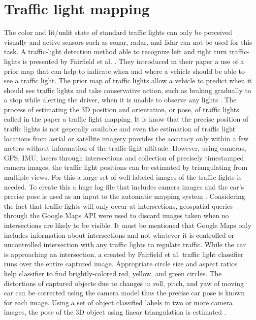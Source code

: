 \documentclass[letterpaper, 10 pt, conference]{ieeeconf} %
\begin{document}
\section{Traffic light mapping}
The color and lit/unlit state of standard traffic lights can only be perceived visually and active sensors such as sonar, radar, and lidar can not be used for this task. A traffic-light detection method able to recognize left and right turn traffic-lights is presented by Fairfield et al. \cite{c5}. They introduced in their paper a use of a prior map that can help to indicate when and where a vehicle should be able to see a traffic light. The prior map of traffic lights allow a vehicle to predict when it should see traffic lights and take conservative action, such as braking gradually to a stop while alerting the driver, when it is unable to observe any lights \cite{c5}. The process of estimating the 3D position and orientation, or pose, of traffic lights called in the paper a traffic light mapping. It is know that the precise position of traffic lights is not generally available and even the estimation of traffic light locations from aerial or satellite imagery provides the accuracy only within a few meters without information of the traffic light altitude. However, using cameras, GPS, IMU, lasers through intersections and collection of precisely timestamped camera images, the traffic light positions can be estimated by triangulating from multiple views. For this a large set of well-labeled images of the traffic lights is needed. To create this a huge log file that includes camera images and the car's precise pose is used as an input to the automatic mapping system \cite{c5}. Considering the fact that traffic lights will only occur at intersections, geospatial queries through the Google Maps API were used to discard images taken when no intersections are likely to be visible. It must be mentioned that Google Maps only includes information about intersections and not whatever it is controlled or uncontrolled intersection with any traffic lights to regulate traffic. While the car is approaching an intersection, a created by Fairfield et al. traffic light classifier runs over the entire captured image. Appropriate circle size and aspect ratios help classifier to find brightly-colored red, yellow, and green circles. The distortions of captured objects due to changes in roll, pitch, and yaw of moving car can be corrected using the camera model thus the precise car pose is known for each image. Using a set of object classified labels in two or more camera images, the pose of the 3D object using linear triangulation is estimated \cite{c5}.
\end{document}
